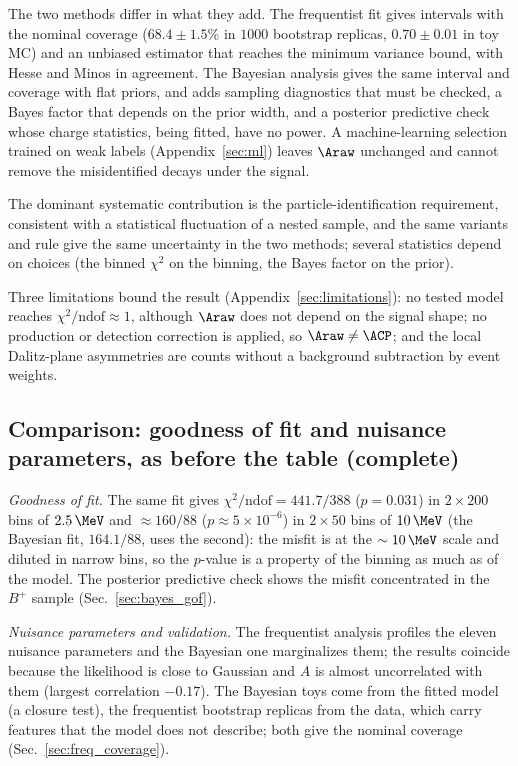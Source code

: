 The two methods differ in what they add. The frequentist fit gives intervals with the nominal coverage ($68.4\pm1.5\%$ in $1000$ bootstrap replicas, $0.70\pm0.01$ in toy MC) and an unbiased estimator that reaches the minimum variance bound, with Hesse and Minos in agreement. The Bayesian analysis gives the same interval and coverage with flat priors, and adds sampling diagnostics that must be checked, a Bayes factor that depends on the prior width, and a posterior predictive check whose charge statistics, being fitted, have no power. A machine-learning selection trained on weak labels (Appendix~\ref{sec:ml}) leaves $\Araw$ unchanged and cannot remove the misidentified decays under the signal.

The dominant systematic contribution is the particle-identification requirement, consistent with a statistical fluctuation of a nested sample, and the same variants and rule give the same uncertainty in the two methods; several statistics depend on choices (the binned $\chi^2$ on the binning, the Bayes factor on the prior).

Three limitations bound the result (Appendix~\ref{sec:limitations}): no tested model reaches $\chi^2/\mathrm{ndof}\approx1$, although $\Araw$ does not depend on the signal shape; no production or detection correction is applied, so $\Araw\neq\ACP$; and the local Dalitz-plane asymmetries are counts without a background subtraction by event weights.

\subsection{Comparison: goodness of fit and nuisance parameters, as before the table (complete)}
\emph{Goodness of fit.} The same fit gives $\chi^2/\mathrm{ndof}=441.7/388$ ($p=0.031$) in $2\times200$ bins of $2.5\,\MeV$ and $\approx160/88$ ($p\approx5\times10^{-6}$) in $2\times50$ bins of $10\,\MeV$ (the Bayesian fit, $164.1/88$, uses the second): the misfit is at the $\sim10\,\MeV$ scale and diluted in narrow bins, so the $p$-value is a property of the binning as much as of the model. The posterior predictive check shows the misfit concentrated in the $B^+$ sample (Sec.~\ref{sec:bayes_gof}).

\emph{Nuisance parameters and validation.} The frequentist analysis profiles the eleven nuisance parameters and the Bayesian one marginalizes them; the results coincide because the likelihood is close to Gaussian and $A$ is almost uncorrelated with them (largest correlation $-0.17$). The Bayesian toys come from the fitted model (a closure test), the frequentist bootstrap replicas from the data, which carry features that the model does not describe; both give the nominal coverage (Sec.~\ref{sec:freq_coverage}).
